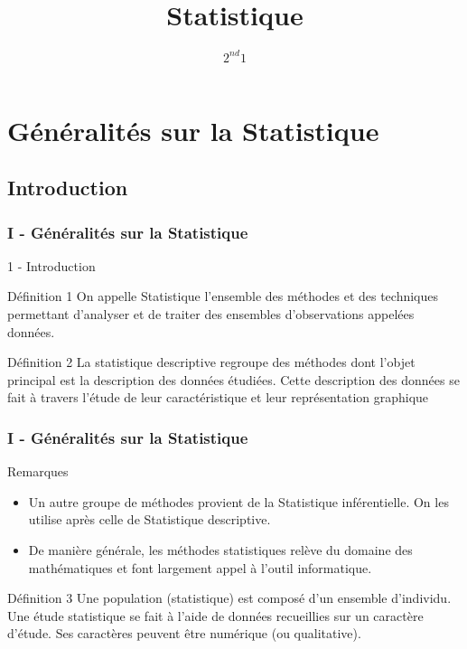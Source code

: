 \documentclass{beamer}
\title{Statistique}
\author{$2^{nd}1$}
\begin{document}
\frame{\titlepage}

\section{Généralités sur la Statistique}
\subsection{Introduction}

\begin{frame}
  \frametitle{I - Généralités sur la Statistique}

  \begin{block}{1 - Introduction}
    \begin{alertblock}{Définition 1}
      On appelle Statistique l'ensemble des méthodes et des techniques permettant d'analyser et de traiter des ensembles d'observations appelées données.
    \end{alertblock}

    \begin{alertblock}{Définition 2}
      La statistique descriptive regroupe des méthodes dont l'objet principal est la description des données étudiées.
      Cette description des données se fait à travers l'étude de leur caractéristique et leur représentation graphique
    \end{alertblock}
  \end{block}
\end{frame}

\begin{frame}
  \frametitle{I - Généralités sur la Statistique}

  \begin{exampleblock}{Remarques}
    \begin{itemize}
    \item Un autre groupe de méthodes provient de la Statistique inférentielle. On les utilise après celle de Statistique descriptive.
    \item De manière générale, les méthodes statistiques relève du domaine des mathématiques et font largement appel à l'outil informatique.
    \end{itemize}
  \end{exampleblock}

  \begin{alertblock}{Définition 3}
    Une population (statistique) est composé d'un ensemble d'individu. Une étude statistique se fait à l'aide de données recueillies
    sur un caractère d'étude. Ses caractères peuvent être numérique (ou  qualitative).
  \end{alertblock}
\end{frame}
\end{document}
